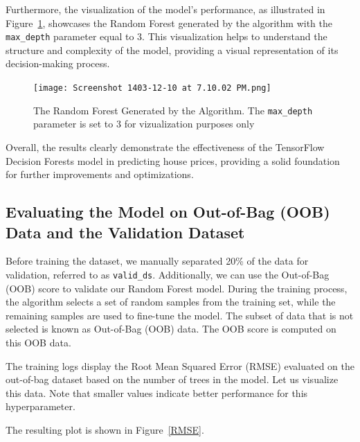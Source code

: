 \documentclass{article}
\begin{document}
Furthermore, the visualization of the model's performance, as illustrated in Figure~\ref{final_res}, showcases the Random Forest generated by the algorithm with the \texttt{max\_depth} parameter equal to 3. This visualization helps to understand the structure and complexity of the model, providing a visual representation of its decision-making process.

\begin{figure}[h]
    \centering
    \texttt{[image: Screenshot 1403-12-10 at 7.10.02 PM.png]}
    \caption{The Random Forest Generated by the Algorithm. The \texttt{max\_depth} parameter is set to 3 for vizualization purposes only}
    \label{final_res}
\end{figure}

Overall, the results clearly demonstrate the effectiveness of the TensorFlow Decision Forests model in predicting house prices, providing a solid foundation for further improvements and optimizations.


\subsection{Evaluating the Model on Out-of-Bag (OOB) Data and the Validation Dataset}

Before training the dataset, we manually separated 20\% of the data for validation, referred to as \texttt{valid\_ds}. Additionally, we can use the Out-of-Bag (OOB) score to validate our Random Forest model. During the training process, the algorithm selects a set of random samples from the training set, while the remaining samples are used to fine-tune the model. The subset of data that is not selected is known as Out-of-Bag (OOB) data. The OOB score is computed on this OOB data.

The training logs display the Root Mean Squared Error (RMSE) evaluated on the out-of-bag dataset based on the number of trees in the model. Let us visualize this data. Note that smaller values indicate better performance for this hyperparameter.

The resulting plot is shown in Figure~\ref{RMSE}.
\end{document}

